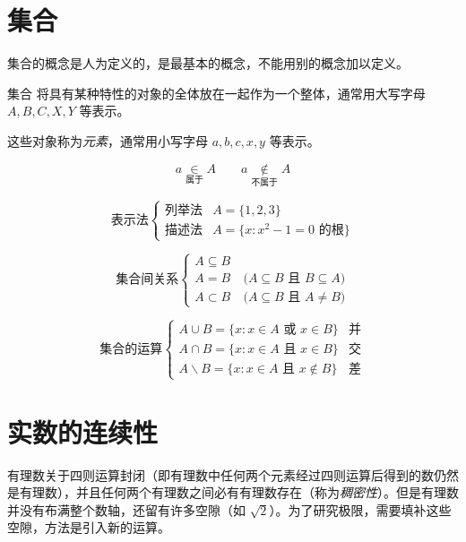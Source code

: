 
\section{集合}

集合的概念是人为定义的，是最基本的概念，不能用别的概念加以定义。

\begin{definition}{集合}
	将具有某种特性的对象的全体放在一起作为一个整体，通常用大写字母 $A, B, C, X, Y$ 等表示。
\end{definition}

这些对象称为\emph{元素}，通常用小写字母 $a, b, c, x, y$ 等表示。

$$
a \underset{属于}{\in} A
\qquad
a \underset{不属于}{\not \in} A
$$

$$
\text{表示法}
\begin{cases}
\text{列举法} & A = \{ 1, 2, 3 \}
\\
\text{描述法} & A = \{ x: x^2 - 1 = 0 \text{ 的根}\}
\end{cases}
$$

$$
\text{集合间关系}
\begin{cases}
A \subseteq B
\\
A = B & \pod{A \subseteq B \text{ 且 } B \subseteq A}
\\
A \subset B & \pod{A \subseteq B \text{ 且 } A \ne B}
\end{cases}
$$

$$
\text{集合的运算}
\begin{cases}
A \cup B = \{ x: x \in A \text{ 或 } x \in B \} & \text{并}
\\
A \cap B = \{ x: x \in A \text{ 且 } x \in B\} & \text{交}
\\
A \backslash B = \{ x: x \in A \text{ 且 } x \not \in B \} & \text{差}
\end{cases}
$$

\section{实数的连续性}

有理数关于四则运算封闭（即有理数中任何两个元素经过四则运算后得到的数仍然是有理数），并且任何两个有理数之间必有有理数存在（称为\emph{稠密性}）。但是有理数并没有布满整个数轴，还留有许多空隙（如 $\sqrt 2$）。为了研究极限，需要填补这些空隙，方法是引入新的运算。

